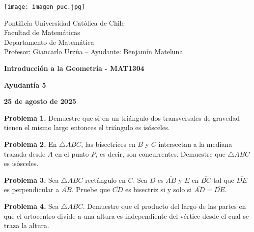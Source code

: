 \documentclass{article}
\begin{document}
\begin{minipage}{2.5cm}
    \texttt{[image: imagen\_puc.jpg]}
\end{minipage}
\begin{minipage}{14cm}
    {\sc Pontificia Universidad Católica de Chile\\
    Facultad de Matemáticas\\
    Departamento de Matemática\\
    Profesor: Giancarlo Urzúa -- Ayudante: Benjamín Mateluna}
\end{minipage}
\vspace{1ex}

{\centerline{\bf Introducción a la Geometría - MAT1304}
\centerline{\bf Ayudantía 5}}
\centerline{\bf 25 de agosto de 2025}

\vspace{1cm}
\noindent\textbf{Problema 1.} Demuestre que si en un triángulo dos transversales de gravedad 
tienen el mismo largo entonces el triángulo es isósceles.

\vspace{2mm}
\noindent\textbf{Problema 2.} En $\triangle ABC$, las bisectrices en $B$ y $C$ intersectan a la
mediana trazada desde $A$ en el punto $P$, es decir, son concurrentes. Demuestre que 
$\triangle ABC$ es isósceles.

\vspace{2mm}
\noindent\textbf{Problema 3.} Sea $\triangle ABC$ rectángulo en $C$. Sea $D$ es $\overline{AB}$ y
$E$ en $\overline{BC}$ tal que $\overline{DE}$ es perpendicular a $\overline{AB}$. Pruebe que 
$\overline{CD}$ es bisectriz si y solo si $\overline{AD}=\overline{DE}$.

\vspace{2mm}
\noindent\textbf{Problema 4.} Sea $\triangle ABC$. Demuestre que el producto del largo de las 
partes en que el ortocentro divide a una altura es independiente del vértice desde el cual se 
traza la altura.

\end{document}

